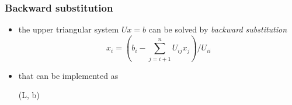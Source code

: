 \begin{frame}[fragile]
%
  \frametitle{Backward substitution}
%
  \begin{itemize}
%
%
  \item the upper triangular system $Ux = b$ can be solved by {\em backward substitution}
    \begin{equation}
      x_{i} = \left( b_{i} - \sum_{j=i+1}^{n} U_{ij}x_{j} \right) / U_{ii}
    \end{equation}
%
  \item that can be implemented as
    \begin{center}
      \begin{minipage}{.85\linewidth}
        \begin{algorithm}[H]
          \label{alg:backward-substitution}
%
          \dontprintsemicolon
          \setalcaphskip{0ex}
%
          \caption{\backsub(L, b)}
%
%
        \end{algorithm}
      \end{minipage}
    \end{center}
%
  \end{itemize}
%
\end{frame}

